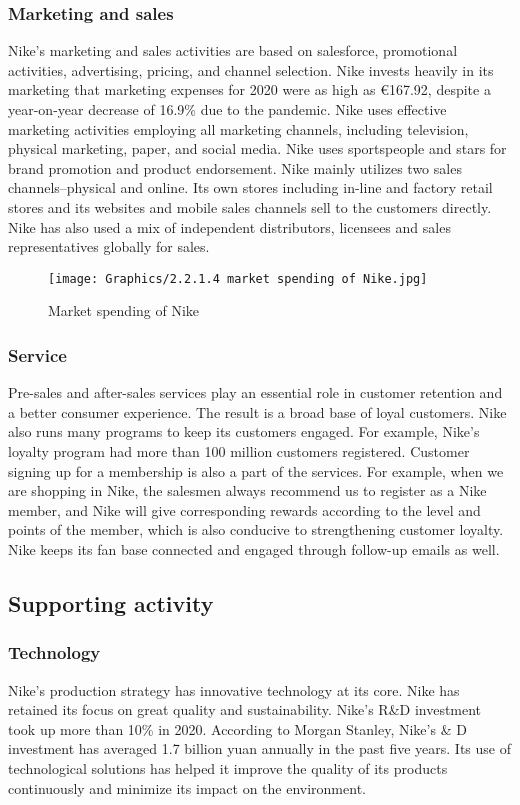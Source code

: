 \documentclass[a4paper, 12pt]{report}
\begin{document}
\subsubsection{Marketing and sales}
Nike's marketing and sales activities are based on salesforce, promotional activities, advertising, pricing, and channel selection. Nike invests heavily in its marketing that marketing expenses for 2020 were as high as €167.92, despite a year-on-year decrease of 16.9\% due to the pandemic. Nike uses effective marketing activities employing all marketing channels, including television, physical marketing, paper, and social media. Nike uses sportspeople and stars for brand promotion and product endorsement. Nike mainly utilizes two sales channels--physical and online. Its own stores including in-line and factory retail stores and its websites and mobile sales channels sell to the customers directly. Nike has also used a mix of independent distributors, licensees and sales representatives globally for sales.
 \begin{figure}[ht]
 			\begin{center}
				\texttt{[image: Graphics/2.2.1.4 market spending of Nike.jpg]}
			\end{center}
       		\caption{\label{2.2.1.4}Market spending of Nike}
 \end{figure}
\subsubsection{Service}
Pre-sales and after-sales services play an essential role in customer retention and a better consumer experience. The result is a broad base of loyal customers. Nike also runs many programs to keep its customers engaged. For example, Nike's loyalty program had more than 100 million customers registered. Customer signing up for a membership is also a part of the services. For example, when we are shopping in Nike, the salesmen always recommend us to register as a Nike member, and Nike will give corresponding rewards according to the level and points of the member, which is also conducive to strengthening customer loyalty. Nike keeps its fan base connected and engaged through follow-up emails as well.
\subsection{Supporting activity}
\subsubsection{Technology}
Nike's production strategy has innovative technology at its core. Nike has retained its focus on great quality and sustainability. Nike's R&D investment took up more than 10\% in 2020. According to Morgan Stanley, Nike's \& D investment has averaged 1.7 billion yuan annually in the past five years. Its use of technological solutions has helped it improve the quality of its products continuously and minimize its impact on the environment.
\end{document}
